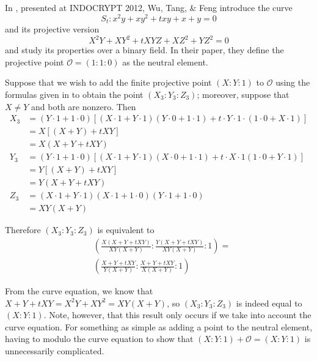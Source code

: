 
In \cite{wu2010new}, presented at INDOCRYPT 2012, Wu, Tang, \& Feng introduce
    the curve
\[
S_t: x^2y + xy^2 + txy + x + y = 0
\]
    and its projective version
\[
X^2Y + XY^2 + tXYZ + XZ^2 + YZ^2 = 0
\]
    and study its properties over a binary field.
In their paper, they define the projective point $\mathcal{O} = (1 : 1 : 0)$ as
    the neutral element.

Suppose that we wish to add the finite projective point $(X : Y : 1)$ to
    $\mathcal{O}$ using the formulas given in \cite{wu2010new} to obtain the
    point $(X_3 : Y_3 : Z_3)$; moreover, suppose that $X \ne Y$ and both are
    nonzero.
Then
\begin{align*}
X_3 &=  (Y \cdot 1 + 1 \cdot 0)\left[(X \cdot 1 + Y \cdot 1)
        (Y \cdot 0 + 1 \cdot 1) + t \cdot Y \cdot 1\cdot(1 \cdot 0 + X \cdot 1)
        \right]\\
    &=  X\left[(X + Y) + tXY\right]\\
    &=  X(X + Y + tXY)\\
Y_3 &=  (Y \cdot 1 + 1 \cdot 0)\left[(X \cdot 1 + Y \cdot 1)
        (X \cdot 0 + 1 \cdot 1) + t \cdot X \cdot 1 (1 \cdot 0 + Y \cdot 1)
        \right]\\
    &=  Y\left[(X + Y) + tXY\right]\\
    &=  Y(X + Y + tXY)\\
Z_3 &=  (X \cdot 1 + Y \cdot 1)(X \cdot 1 + 1 \cdot 0)(Y \cdot 1 + 1 \cdot 0)\\
    &=  XY(X + Y)
\end{align*}

Therefore $(X_3 : Y_3 : Z_3)$ is equivalent to
\begin{align*}
&\left(
\frac{X(X + Y + tXY)}{XY(X + Y)} : \frac{Y(X + Y + tXY)}{XY(X + Y)} : 1
\right)
=\\
&\left(
\frac{X + Y + tXY}{Y(X + Y)} : \frac{X + Y + tXY}{X(X + Y)} : 1
\right)
\end{align*}

From the curve equation, we know that $X + Y + tXY = X^2Y + XY^2 = XY(X + Y)$,
    so $(X_3 : Y_3 : Z_3)$ is indeed equal to $(X : Y : 1)$.
Note, however, that this result only occurs if we take into account the curve
    equation.
For something as simple as adding a point to the neutral element, having to
    modulo the curve equation to show that $(X : Y : 1) + \mathcal{O} =
    (X : Y : 1)$ is unnecessarily complicated.


